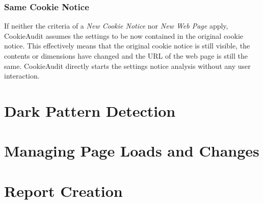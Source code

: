 \subsubsection{Same Cookie Notice}
If neither the criteria of a \emph{New Cookie Notice} nor \emph{New Web Page} apply, CookieAudit assumes the settings to be now contained in the original cookie notice.
This effectively means that the original cookie notice is still visible, the contents or dimensions have changed and the URL of the web page is still the same.
CookieAudit directly starts the settings notice analysis without any user interaction.

\section{Dark Pattern Detection}
\section{Managing Page Loads and Changes}
\section{Report Creation}
